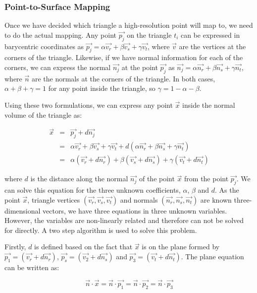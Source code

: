 \documentclass[10pt,oneside,fleqn,a4paper]{book}
\begin{document}
\subsubsection{Point-to-Surface Mapping}
Once we have decided which triangle a high-resolution point will map to, we need to do the actual mapping. Any point $\vec{p_j}$ on the triangle $t_i$ can be expressed in barycentric coordinates as $\vec{p_j} = \alpha\vec{v_r} + \beta\vec{v_s} + \gamma\vec{v_t}$, where $\vec{v}$ are the vertices at the corners of the triangle. Likewise, if we have normal information for each of the corners, we can express the normal $\vec{n_j}$ at the point $\vec{p_j}$ as $\vec{n_j} = \alpha\vec{n_r} + \beta\vec{n_s} + \gamma\vec{n_t}$, where $\vec{n}$ are the normals at the corners of the triangle. In both cases, $\alpha + \beta + \gamma = 1$ for any point inside the triangle, so $\gamma = 1 - \alpha - \beta$.

Using these two formulations, we can express any point $\vec{x}$ inside the normal volume of the triangle as:

\begin{eqnarray} \label{eqn:point}
\vec{x} & = & \vec{p_j} + d \vec{n_j}\nonumber \\
        & = & \alpha \vec{v_r} + \beta \vec{v_s} + \gamma\vec{v_t} + d( \alpha \vec{n_r} + \beta \vec{n_s} + \gamma\vec{n_t}  )\nonumber \\
        & = &  \alpha ( \vec{v_r}+ d\vec{n_r}) + \beta  ( \vec{v_s}+ d\vec{n_s}) + \gamma ( \vec{v_t}+ d\vec{n_t})
\end{eqnarray}

where $d$ is the distance along the normal $\vec{n_j}$ of the point $\vec{x}$ from the point $\vec{p_j}$. We can solve this equation for the three unknown coefficients, $\alpha$, $\beta$ and $d$. As the point $\vec{x}$, triangle vertices $(\vec{v_r},\vec{v_s},\vec{v_t})$ and normals $(\vec{n_r},\vec{n_s},\vec{n_t})$ are known three-dimensional vectors, we have three equations in three unknown variables. However, the variables are non-linearly related and therefore can not be solved for directly. A two step algorithm is used to solve this problem.

Firstly, $d$ is defined based on the fact that $\vec{x}$ is on the plane formed by $\vec{p_1} = (\vec{v_r}+d\vec{n_r})$, $\vec{p_s} = (\vec{v_2}+d\vec{n_s})$ and $\vec{p_3} = (\vec{v_t}+d\vec{n_t})$. The plane equation can be written as:

\begin{equation} \label{eqn:plane}
\vec{n}\cdot\vec{x} = \vec{n}\cdot\vec{p_1} = \vec{n}\cdot\vec{p_2} = \vec{n}\cdot\vec{p_3}
\end{equation}
\end{document}
